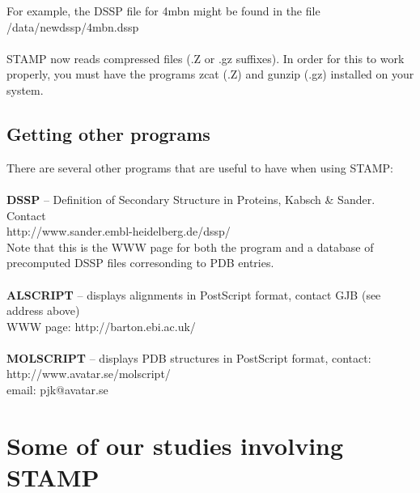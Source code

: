 For example, the DSSP file for 4mbn might be found in the file 
/data/newdssp/4mbn.dssp\\
\\
STAMP now reads compressed files (.Z or .gz suffixes).  In order for this
to work properly, you must have the programs zcat (.Z) and gunzip (.gz) installed
on your system.

\section{Getting other programs}

There are several other programs that are useful to have when using STAMP:\\
\\
{\bf DSSP} -- Definition of Secondary Structure in Proteins, Kabsch \& Sander.  Contact\\
http://www.sander.embl-heidelberg.de/dssp/\\
Note that this is the WWW page for both the program and a database of precomputed
DSSP files corresonding to PDB entries.\\
\\
{\bf ALSCRIPT} -- displays alignments in PostScript format, contact GJB (see address above)\\
WWW page: http://barton.ebi.ac.uk/\\
\\
{\bf MOLSCRIPT} -- displays PDB structures in PostScript format, contact:\\
http://www.avatar.se/molscript/\\
email: pjk@avatar.se\\

\chapter{Some of our studies involving STAMP}

